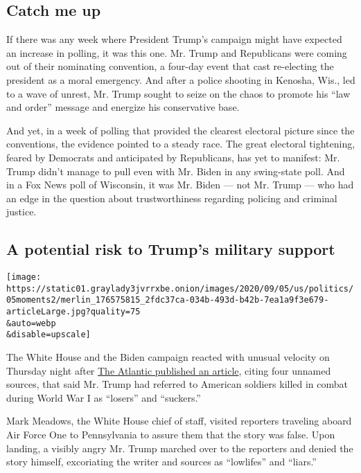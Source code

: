 \hypertarget{catch-me-up}{%
\subsection{Catch me up}\label{catch-me-up}}

If there was any week where President Trump's campaign might have
expected an increase in polling, it was this one. Mr. Trump and
Republicans were coming out of their nominating convention, a four-day
event that cast re-electing the president as a moral emergency. And
after a police shooting in Kenosha, Wis., led to a wave of unrest, Mr.
Trump sought to seize on the chaos to promote his ``law and order''
message and energize his conservative base.

And yet, in a week of polling that provided the clearest electoral
picture since the conventions, the evidence pointed to a steady race.
The great electoral tightening, feared by Democrats and anticipated by
Republicans, has yet to manifest: Mr. Trump didn't manage to pull even
with Mr. Biden in any swing-state poll. And in a Fox News poll of
Wisconsin, it was Mr. Biden --- not Mr. Trump --- who had an edge in the
question about trustworthiness regarding policing and criminal justice.

\hypertarget{a-potential-risk-to-trumps-military-support}{%
\subsection{A potential risk to Trump's military
support}\label{a-potential-risk-to-trumps-military-support}}

\texttt{[image: https://static01.graylady3jvrrxbe.onion/images/2020/09/05/us/politics/05moments2/merlin\_176575815\_2fdc37ca-034b-493d-b42b-7ea1a9f3e679-articleLarge.jpg?quality=75\\\&auto=webp\\\&disable=upscale]}

The White House and the Biden campaign reacted with unusual velocity on
Thursday night after
\href{https://www.theatlantic.com/politics/archive/2020/09/trump-americans-who-died-at-war-are-losers-and-suckers/615997/}{The
Atlantic published an article}, citing four unnamed sources, that said
Mr. Trump had referred to American soldiers killed in combat during
World War I as ``losers'' and ``suckers.''

Mark Meadows, the White House chief of staff, visited reporters
traveling aboard Air Force One to Pennsylvania to assure them that the
story was false. Upon landing, a visibly angry Mr. Trump marched over to
the reporters and denied the story himself, excoriating the writer and
sources as ``lowlifes'' and ``liars.''

